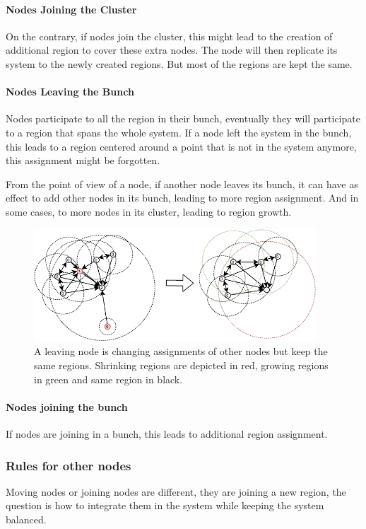 \documentclass[a4paper,11pt,oneside]{report}
\begin{document}
\paragraph{Nodes Joining the Cluster} 
On the contrary, if nodes join the cluster, this might lead to the creation of
additional region to cover these extra nodes. The node will then replicate its
system to the newly created regions. But most of the regions are kept the same.

\paragraph{Nodes Leaving the Bunch} 
Nodes participate to all the region in their bunch, eventually they will
participate to a region that spans the whole system. If a node left the system
in the bunch,  this leads to a region centered around a point that is not in
the system anymore, this assignment might be forgotten. 

From the point of view of a node, if another node leaves its bunch, it can have
as effect to add other nodes in its bunch, leading to more region assignment.
And in some cases, to more nodes in its cluster, leading to region growth. 

\begin{figure}[!h] 
\centering
\includegraphics[width=300pt]{figures/LocarnoTreaties-Leaving-cluster}
\caption{A leaving node is changing assignments of other
    nodes but keep the same regions. Shrinking regions are depicted in red,
    growing regions in green and same region in black. }
\label{fig:LocarnoTreaties-Leaving-cluster}
\end{figure}

\paragraph{Nodes joining the bunch} 
If nodes are joining in a bunch, this leads to additional region assignment. 

\subsubsection{Rules for other nodes}
Moving nodes or joining nodes are different, they are joining a new region, the
question is how to integrate them in the system while keeping the system
balanced. 
\end{document}
